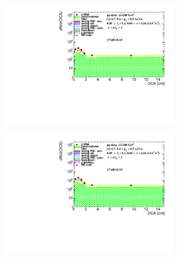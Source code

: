 \begin{figure}[h!]
\begin{subfigure}{.45\textwidth}
	\end{subfigure}
	\begin{subfigure}{.45\textwidth}
		\includegraphics[width=\linewidth, page=8]{chapters/chrgSTAR/img/DCAproton/background_p_1.pdf}
	\end{subfigure}
	\begin{subfigure}{.45\textwidth}
		\includegraphics[width=\linewidth, page=11]{chapters/chrgSTAR/img/DCAproton/background_p_1.pdf}
	\end{subfigure}
	\begin{subfigure}{.45\textwidth}

\end{subfigure}
\end{figure}
